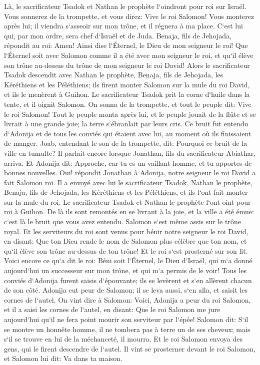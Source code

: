 \verse Là, le sacrificateur Tsadok et Nathan le prophète l`oindront pour roi sur Israël. Vous sonnerez de la trompette, et vous direz: Vive le roi Salomon! 
\verse Vous monterez après lui; il viendra s`asseoir sur mon trône, et il régnera à ma place. C`est lui qui, par mon ordre, sera chef d`Israël et de Juda. 
\verse Benaja, fils de Jehojada, répondit au roi: Amen! Ainsi dise l`Éternel, le Dieu de mon seigneur le roi! 
\verse Que l`Éternel soit avec Salomon comme il a été avec mon seigneur le roi, et qu`il élève son trône au-dessus du trône de mon seigneur le roi David! 
\verse Alors le sacrificateur Tsadok descendit avec Nathan le prophète, Benaja, fils de Jehojada, les Kéréthiens et les Péléthiens; ils firent monter Salomon sur la mule du roi David, et ils le menèrent à Guihon. 
\verse Le sacrificateur Tsadok prit la corne d`huile dans la tente, et il oignit Salomon. On sonna de la trompette, et tout le peuple dit: Vive le roi Salomon! 
\verse Tout le peuple monta après lui, et le peuple jouait de la flûte et se livrait à une grande joie; la terre s`ébranlait par leurs cris. 
\verse Ce bruit fut entendu d`Adonija et de tous les conviés qui étaient avec lui, au moment où ils finissaient de manger. Joab, entendant le son de la trompette, dit: Pourquoi ce bruit de la ville en tumulte? 
\verse Il parlait encore lorsque Jonathan, fils du sacrificateur Abiathar, arriva. Et Adonija dit: Approche, car tu es un vaillant homme, et tu apportes de bonnes nouvelles. 
\verse Oui! répondit Jonathan à Adonija, notre seigneur le roi David a fait Salomon roi. 
\verse Il a envoyé avec lui le sacrificateur Tsadok, Nathan le prophète, Benaja, fils de Jehojada, les Kéréthiens et les Péléthiens, et ils l`ont fait monter sur la mule du roi. 
\verse Le sacrificateur Tsadok et Nathan le prophète l`ont oint pour roi à Guihon. De là ils sont remontés en se livrant à la joie, et la ville a été émue: c`est là le bruit que vous avez entendu. 
\verse Salomon s`est même assis sur le trône royal. 
\verse Et les serviteurs du roi sont venus pour bénir notre seigneur le roi David, en disant: Que ton Dieu rende le nom de Salomon plus célèbre que ton nom, et qu`il élève son trône au-dessus de ton trône! Et le roi s`est prosterné sur son lit. 
\verse Voici encore ce qu`a dit le roi: Béni soit l`Éternel, le Dieu d`Israël, qui m`a donné aujourd`hui un successeur sur mon trône, et qui m`a permis de le voir! 
\verse Tous les conviés d`Adonija furent saisis d`épouvante; ils se levèrent et s`en allèrent chacun de son côté. 
\verse Adonija eut peur de Salomon; il se leva aussi, s`en alla, et saisit les cornes de l`autel. 
\verse On vint dire à Salomon: Voici, Adonija a peur du roi Salomon, et il a saisi les cornes de l`autel, en disant: Que le roi Salomon me jure aujourd`hui qu`il ne fera point mourir son serviteur par l`épée! 
\verse Salomon dit: S`il se montre un honnête homme, il ne tombera pas à terre un de ses cheveux; mais s`il se trouve en lui de la méchanceté, il mourra. 
\verse Et le roi Salomon envoya des gens, qui le firent descendre de l`autel. Il vint se prosterner devant le roi Salomon, et Salomon lui dit: Va dans ta maison. 

